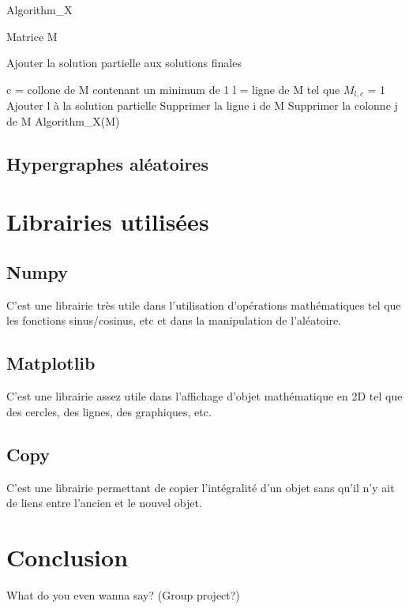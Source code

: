 \documentclass{article}
\begin{document}
		
		\begin{algorithm}[H]
		\caption{Algorithm\_X}
		\begin{algorithmic}[1]
		\REQUIRE Matrice M
		
			\STATE Ajouter la solution partielle aux solutions finales
		
		\ELSE
			\STATE c = collone de M contenant un minimum de 1
			\STATE l = ligne de M tel que $M_{l,c}$ = 1
			\STATE Ajouter l à la solution partielle
			\STATE Supprimer la ligne i de M
			\ENDFOR
			\STATE Supprimer la colonne j de M
			\ENDFOR
			\STATE Algorithm\_X(M)
		\ENDIF
		
	
		\end{algorithmic}
		\end{algorithm}
		
	
	\subsection{Hypergraphes aléatoires}
	
\section{Librairies utilisées}

	\subsection{Numpy}
		C'est une librairie très utile dans l'utilisation d'opérations mathématiques tel que les fonctions sinus/cosinus, etc et dans la manipulation de l'aléatoire.

	\subsection{Matplotlib}
		C'est une librairie assez utile dans l'affichage d'objet mathématique en 2D tel que des cercles, des lignes, des graphiques, etc.
	
	\subsection{Copy}
		C'est une librairie permettant de copier l'intégralité d'un objet sans qu'il n'y ait de liens entre l'ancien et le nouvel objet.

\section{Conclusion}
	What do you even wanna say? (Group project?)
\end{document}
